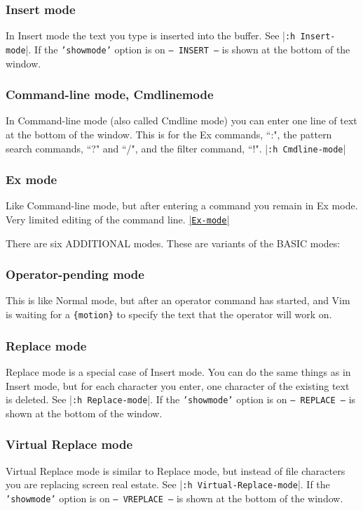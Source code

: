 \subsubsection{Insert mode}
In Insert mode the text you type is inserted into the buffer.
See |\texttt{:h Insert-mode}|.
If the \texttt{'showmode'} option is on \texttt{-- INSERT --} is shown at the bottom of the window.

\subsubsection{Command-line mode, Cmdlinemode}
In Command-line mode (also called Cmdline mode) you can enter one line of text at the bottom of the window.
This is for the Ex commands, ``:", the pattern search commands, ``?" and ``/", and the filter command, ``!".
|\texttt{:h Cmdline-mode}|

\subsubsection{Ex mode}
Like Command-line mode, but after entering a command you remain in Ex mode.
Very limited editing of the command line.
\hyperref[Ex-mode]{|\texttt{Ex-mode}|}

There are six ADDITIONAL modes.  These are variants of the BASIC modes:


\subsubsection{Operator-pending mode}
\label{Operator-pending}
\label{Operator-pending-mode}
This is like Normal mode, but after an operator command has started, and Vim is waiting for a \texttt{\{motion\}} to specify the text that the operator will work on.

\subsubsection{Replace mode}
Replace mode is a special case of Insert mode.
You can do the same things as in Insert mode, but for each character you enter, one character of the existing text is deleted.
See |\texttt{:h Replace-mode}|.
If the \texttt{'showmode'} option is on \texttt{-- REPLACE --} is shown at the bottom of the window.

\subsubsection{Virtual Replace mode}
Virtual Replace mode is similar to Replace mode, but instead of file characters you are replacing screen real estate.
See |\texttt{:h Virtual-Replace-mode}|.
If the \texttt{'showmode'} option is on \texttt{-- VREPLACE --} is shown at the bottom of the window.


